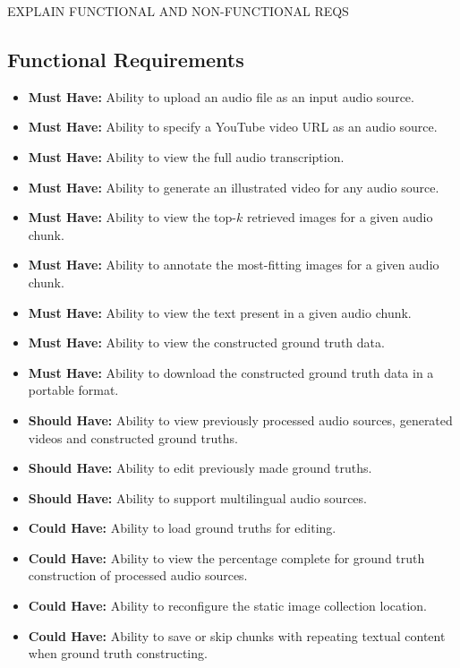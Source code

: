 \documentclass{l4proj}
\begin{document}
EXPLAIN FUNCTIONAL AND NON-FUNCTIONAL REQS

\subsection{Functional Requirements}
\begin{itemize}
    \item \textbf{Must Have:} Ability to upload an audio file as an input audio source.
    \item \textbf{Must Have:} Ability to specify a YouTube video URL as an audio source.
    \item \textbf{Must Have:} Ability to view the full audio transcription.
    \item \textbf{Must Have:} Ability to generate an illustrated video for any audio source.
    \item \textbf{Must Have:} Ability to view the top-$k$ retrieved images for a given audio chunk.
    \item \textbf{Must Have:} Ability to annotate the most-fitting images for a given audio chunk.
    \item \textbf{Must Have:} Ability to view the text present in a given audio chunk.
    \item \textbf{Must Have:} Ability to view the constructed ground truth data.
    \item \textbf{Must Have:} Ability to download the constructed ground truth data in a portable format.
    \item \textbf{Should Have:} Ability to view previously processed audio sources, generated videos and constructed ground truths.
    \item \textbf{Should Have:} Ability to edit previously made ground truths.
    \item \textbf{Should Have:} Ability to support multilingual audio sources.
    \item \textbf{Could Have:} Ability to load ground truths for editing.
    \item \textbf{Could Have:} Ability to view the percentage complete for ground truth construction of processed audio sources.
    \item \textbf{Could Have:} Ability to reconfigure the static image collection location.
    \item \textbf{Could Have:} Ability to save or skip chunks with repeating textual content when ground truth constructing.
\end{itemize}
\end{document}
